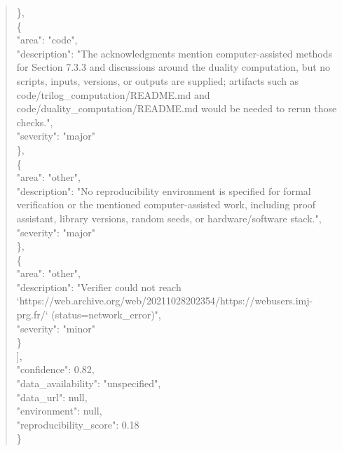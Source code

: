 \documentclass[11pt]{article}
\begin{document}
\begin{quote}
    \},\\
    \{\\
      "area": "code",\\
      "description": "The acknowledgments mention computer-assisted methods for Section 7.3.3 and discussions around the duality computation, but no scripts, inputs, versions, or outputs are supplied; artifacts such as code/trilog\_computation/README.md and code/duality\_computation/README.md would be needed to rerun those checks.",\\
      "severity": "major"\\
    \},\\
    \{\\
      "area": "other",\\
      "description": "No reproducibility environment is specified for formal verification or the mentioned computer-assisted work, including proof assistant, library versions, random seeds, or hardware/software stack.",\\
      "severity": "major"\\
    \},\\
    \{\\
      "area": "other",\\
      "description": "Verifier could not reach `https://web.archive.org/web/20211028202354/https://webusers.imj-prg.fr/` (status=network\_error)",\\
      "severity": "minor"\\
    \}\\
  ],\\
  "confidence": 0.82,\\
  "data\_availability": "unspecified",\\
  "data\_url": null,\\
  "environment": null,\\
  "reproducibility\_score": 0.18\\
\}\\
\end{quote}
\end{document}
